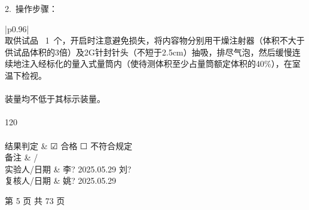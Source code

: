 \documentclass[UTF8,10pt,a4paper,fontset=fandol]{ctexart}
\newcommand{\fieldvalue}[1]{#1}
\newcommand{\handwritten}[1]{#1}
\newcommand{\checkboxfield}[1]{\ifstrequal{#1}{checked}{☑}{\ifstrequal{#1}{unclear}{?}{☐}}}
\begin{document}
\medskip

2.\ 操作步骤：

\begin{tabular}{|p{0.96\linewidth}|}
\hline
{}\\
\hline
取供试品\ 
\fieldvalue{\handwritten{1}}\ 个，开启时注意避免损失，将内容物分别用干燥注射器（体积不大于供试品体积的3倍）及2G针封针头（不短于2.5cm）抽吸，排尽气泡，然后缓慢连续地注入经标化的量入式量筒内（使待测体积至少占量筒额定体积的40\%），在室温下检视。\\
\hline
{}\\
\hline
装量均不低于其标示装量。\\
\hline
{}\\
\hline
\fieldvalue{\handwritten{120}}\\
\hline
{}\\
\hline
结果判定 &
\fieldvalue{\checkboxfield{checked}} 合格
\qquad
\fieldvalue{\checkboxfield{unchecked}} 不符合规定\\
\hline
备注 &
\fieldvalue{\handwritten{/}}\\
\hline
实验人/日期 &
\fieldvalue{\handwritten{李?}}
\qquad
\fieldvalue{\handwritten{2025.05.29}}
\qquad
\fieldvalue{\handwritten{刘?}}\\
\hline
复核人/日期 &
\fieldvalue{\handwritten{姚?}}
\qquad
\fieldvalue{\handwritten{2025.05.29}}\\
\hline
\end{tabular}

\begin{center}
第 5 页 共 73 页
\end{center}
\end{document}
